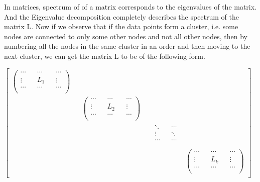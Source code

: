 \documentclass[english]{article}
\theoremstyle{plain}
\begin{document}
In matrices, spectrum of of a matrix corresponds to the eigenvalues of the matrix. And the Eigenvalue decomposition completely describes the spectrum of the matrix L. Now if we observe that if the data points form a cluster, i.e. some nodes are connected to only some other nodes and not all other nodes, then by numbering all the nodes in the same cluster in an order and then moving to the next cluster, we can get the matrix L to be of the following form.

\bigskip

$
\begin{bmatrix}
\begin{pmatrix}
\cdots && \cdots && \cdots \\
\vdots && L_{1}  && \vdots \\
\cdots && \cdots && \cdots \\
\end{pmatrix} \\
&&\begin{pmatrix}
\cdots && \cdots && \cdots \\
\vdots && L_{2}  && \vdots \\
\cdots && \cdots && \cdots \\
\end{pmatrix} \\
&&&&\begin{matrix}
\ddots && \cdots \\
\vdots && \ddots \\
\cdots && \cdots \\
\end{matrix} \\
&&&&&\begin{pmatrix}
\cdots && \cdots && \cdots \\
\vdots && L_{k}  && \vdots \\
\cdots && \cdots && \cdots \\
\end{pmatrix} \\
\end{bmatrix}
$

\bigskip
\end{document}

